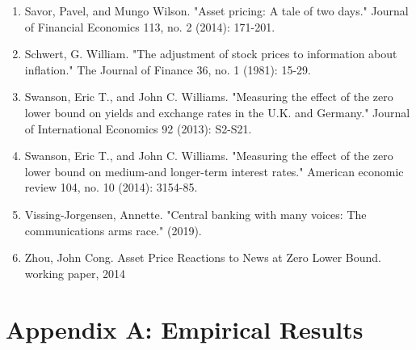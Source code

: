 \documentclass[12pt]{article}
\begin{document}
\begin{enumerate}
    \item{Savor, Pavel, and Mungo Wilson. "Asset pricing: A tale of two days." Journal of Financial Economics 113, no. 2 (2014): 171-201.}
    \item{Schwert, G. William. "The adjustment of stock prices to information about inflation." The Journal of Finance 36, no. 1 (1981): 15-29.}
    \item{Swanson, Eric T., and John C. Williams. "Measuring the effect of the zero lower bound on yields and exchange rates in the U.K. and Germany." Journal of International Economics 92 (2013):  S2-S21.}
    \item{Swanson, Eric T., and John C. Williams. "Measuring the effect of the zero lower bound on medium-and longer-term interest rates." American economic review 104, no. 10 (2014): 3154-85.}
    \item{Vissing-Jorgensen, Annette. "Central banking with many voices: The communications arms race." (2019).}
    \item{Zhou, John Cong. Asset Price Reactions to News at Zero Lower Bound. working paper, 2014}
\end{enumerate}
    
\pagebreak

\section{Appendix A: Empirical Results} \label{sec:Model}
\end{document}
